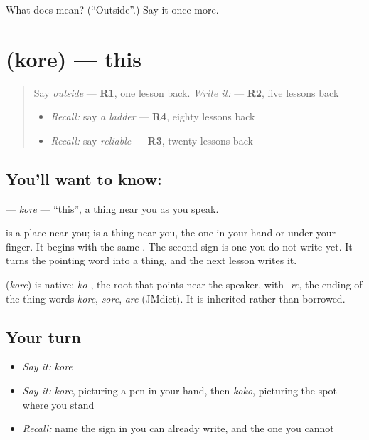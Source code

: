 \begin{tcolorbox}[breakable,colback=teal!4,colframe=teal!35!black,title={Before you move on}]
What does  mean? (\textquotedblleft{}Outside\textquotedblright{}.) Say it once more.
\end{tcolorbox}
\section[\texorpdfstring{\ja{これ} (kore)}{これ (kore)}]{ (kore) — this}

\label{lesson:JA-C132-kore}



\begin{quote}
Say \emph{outside} — \textbf{R1}, one lesson back. \emph{Write it:} \textbf{} — \textbf{R2}, five lessons back

\begin{itemize}
\raggedright
  \item \emph{Recall:} say \emph{a ladder} — \textbf{R4}, eighty lessons back
  \item \emph{Recall:} say \emph{reliable} — \textbf{R3}, twenty lessons back
\end{itemize}
\end{quote}

\subsection*{You'll want to know: }
\textbf{} — \emph{kore} — \textquotedblleft{}this\textquotedblright{}, a thing near you as you speak.

\textbf{} is a place near you; \textbf{} is a thing near you, the one in your hand or under your finger. It begins with the same \textbf{}. The second sign is one you do not write yet. It turns the pointing word into a thing, and the next lesson writes it.

\begin{cousinweb}
\textbf{} (\emph{kore}) is native: \emph{ko-}, the root that points near the speaker, with \emph{-re}, the ending of the thing words \emph{kore}, \emph{sore}, \emph{are} (JMdict). It is inherited rather than borrowed.
\end{cousinweb}

\subsection*{Your turn}
\begin{itemize}
\raggedright
  \item \emph{Say it:} \emph{kore}
  \item \emph{Say it:} \emph{kore}, picturing a pen in your hand, then \emph{koko}, picturing the spot where you stand
  \item \emph{Recall:} name the sign in \textbf{} you can already write, and the one you cannot
\end{itemize}

